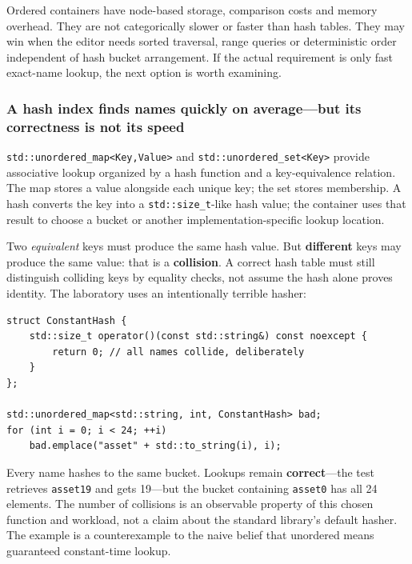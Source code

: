 Ordered containers have node-based storage, comparison costs and memory overhead. They are not categorically slower or faster than hash tables. They may win when the editor needs sorted traversal, range queries or deterministic order independent of hash bucket arrangement. If the actual requirement is only fast exact-name lookup, the next option is worth examining.

\subsubsection{A hash index finds names quickly on average---but its correctness is not its speed}\label{a-hash-index-finds-names-quickly-on-averagebut-its-correctness-is-not-its-speed}

\texttt{std::unordered\_map\textless{}Key,Value\textgreater{}} and \texttt{std::unordered\_set\textless{}Key\textgreater{}} provide associative lookup organized by a hash function and a key-equivalence relation. The map stores a value alongside each unique key; the set stores membership. A hash converts the key into a \texttt{std::size\_t}-like hash value; the container uses that result to choose a bucket or another implementation-specific lookup location.

Two \emph{equivalent} keys must produce the same hash value. But \textbf{different} keys may produce the same value: that is a \textbf{collision}. A correct hash table must still distinguish colliding keys by equality checks, not assume the hash alone proves identity. The laboratory uses an intentionally terrible hasher:

\begin{verbatim}
struct ConstantHash {
    std::size_t operator()(const std::string&) const noexcept {
        return 0; // all names collide, deliberately
    }
};

std::unordered_map<std::string, int, ConstantHash> bad;
for (int i = 0; i < 24; ++i)
    bad.emplace("asset" + std::to_string(i), i);
\end{verbatim}

Every name hashes to the same bucket. Lookups remain \textbf{correct}---the test retrieves \texttt{asset19} and gets 19---but the bucket containing \texttt{asset0} has all 24 elements. The number of collisions is an observable property of this chosen function and workload, not a claim about the standard library's default hasher. The example is a counterexample to the naive belief that unordered means guaranteed constant-time lookup.

